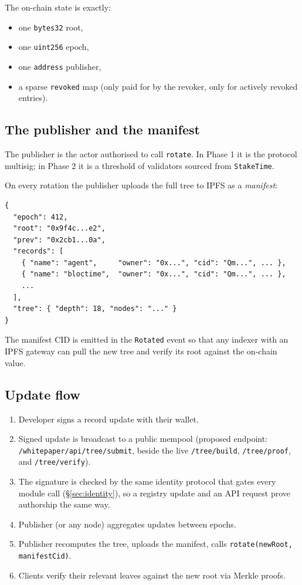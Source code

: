 \documentclass[11pt,a4paper]{article}
\begin{document}
The on-chain state is exactly:
\begin{itemize}
    \item one \texttt{bytes32} root,
    \item one \texttt{uint256} epoch,
    \item one \texttt{address} publisher,
    \item a sparse \texttt{revoked} map (only paid for by the revoker, only for actively revoked entries).
\end{itemize}

\subsection{The publisher and the manifest}

The publisher is the actor authorised to call \texttt{rotate}. In Phase 1 it is the protocol multisig; in Phase 2 it is a threshold of validators sourced from \texttt{StakeTime}.

On every rotation the publisher uploads the full tree to IPFS as a \emph{manifest}:

\begin{lstlisting}[basicstyle=\ttfamily\small,frame=single,backgroundcolor=\color{codebg}]
{
  "epoch": 412,
  "root": "0x9f4c...e2",
  "prev": "0x2cb1...0a",
  "records": [
    { "name": "agent",     "owner": "0x...", "cid": "Qm...", ... },
    { "name": "bloctime",  "owner": "0x...", "cid": "Qm...", ... },
    ...
  ],
  "tree": { "depth": 18, "nodes": "..." }
}
\end{lstlisting}

The manifest CID is emitted in the \texttt{Rotated} event so that any indexer with an IPFS gateway can pull the new tree and verify its root against the on-chain value.

\subsection{Update flow}

\begin{enumerate}
    \item Developer signs a record update with their wallet.
    \item Signed update is broadcast to a public mempool (proposed endpoint: \texttt{/whitepaper/api/tree/submit}, beside the live \texttt{/tree/build}, \texttt{/tree/proof}, and \texttt{/tree/verify}).
    \item The signature is checked by the same identity protocol that gates every module call (\S\ref{sec:identity}), so a registry update and an API request prove authorship the same way.
    \item Publisher (or any node) aggregates updates between epochs.
    \item Publisher recomputes the tree, uploads the manifest, calls \texttt{rotate(newRoot, manifestCid)}.
    \item Clients verify their relevant leaves against the new root via Merkle proofs.
\end{enumerate}
\end{document}
